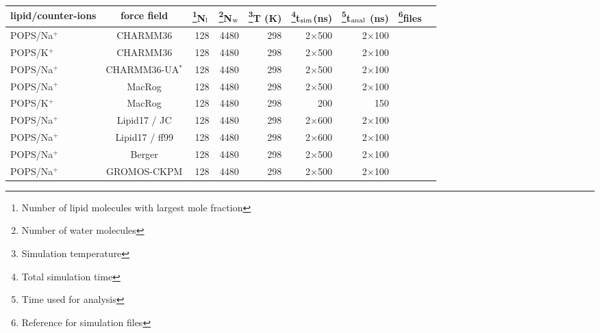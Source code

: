 \documentclass[aps,prl,superscriptaddress,twocolumn]{revtex4}
\begin{document}
\begin{table*}[htb]
\centering
\caption{The list of MD simulations of pure PS bilayers without additional salt along with the references to the force fields used and the MD trajectories.
  Notation 2$\times$[time] indicates that two independent MD runs was conducted.
  JC refers to the Joung-Cheatham ion parameters~\cite{joung08} and ff99 to the default Amber ion parameters~\cite{aqvist90}.
  Additional simulation details are given in the supplementary information.
  $^*$ Force field parameters for PS lipids generated for this work, for full details see the supplementary information.
}\label{PSsystems}
\begin{tabular}{lcrrrrrcc}
lipid/counter-ions  & force field & \footnote{Number of lipid molecules with largest mole fraction}N$_{{\rm l}}$  & \footnote{Number of water molecules}N$_{{\rm w}}$  & \footnote{Simulation temperature}T (K)  & \footnote{Total simulation time}t$_{{\rm sim}}$(ns)  & \footnote{Time used for analysis}t$_{{\rm anal}}$ (ns)  & \footnote{Reference for simulation files}files & \tabularnewline
\hline 
POPS/Na$^{+}$  & CHARMM36 \cite{venable13}  & 128  & 4480  & 298  & 2$\times$500  & 2$\times$100  & \cite{charmm36POPS298K}  & \tabularnewline
POPS/K$^{+}$  & CHARMM36 \cite{venable13}  & 128  & 4480  & 298  & 2$\times$500  & 2$\times$100  & \cite{charmm36POPS298Kpotassium}  & \tabularnewline
POPS/Na$^{+}$  & CHARMM36-UA$^*$ \cite{venable13,lee14} & 128  & 4480  & 298  & 2$\times$500  & 2$\times$100  & \cite{charmm36uaPOPS298K}  & \tabularnewline
POPS/Na$^{+}$  & MacRog \cite{maciejewski14}  & 128  & 4480  & 298  & 2$\times$500  & 2$\times$100  & \cite{macrogPOPS298Kcorrect}  & \tabularnewline
POPS/K$^{+}$  & MacRog \cite{maciejewski14}  & 128  & 4480  & 298  & 200  & 150  & \cite{macrogPOPS298KwithK}  & \tabularnewline
POPS/Na$^{+}$  & Lipid17 \cite{gould18} / JC \cite{joung08}  & 128  & 4480  & 298  & 2$\times$600  & 2$\times$100  & \cite{lipid17POPSjcions}  & \tabularnewline
POPS/Na$^{+}$  & Lipid17 \cite{gould18} / ff99 \cite{aqvist90}  & 128  & 4480  & 298  & 2$\times$600  & 2$\times$100  & \cite{lipid17POPSff99ions}  & \tabularnewline
POPS/Na$^{+}$  & Berger \cite{mukhopadhyay04}  & 128  & 4480  & 298  & 2$\times$500  & 2$\times$100  & \cite{bergerPOPS298K}  & \tabularnewline
POPS/Na$^{+}$  & GROMOS-CKPM \cite{Chandrasekhar03,kukol09,piggot12} & 128  & 4480  & 298  & 2$\times$500  & 2$\times$100  & \cite{ckp1POPS303K}  & \tabularnewline

\end{tabular}
\end{table*}
\end{document}
